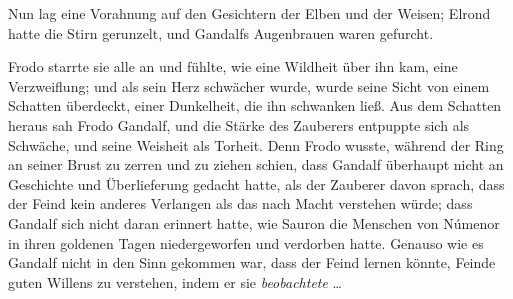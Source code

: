 Nun lag eine Vorahnung auf den Gesichtern der Elben und der Weisen; Elrond hatte die Stirn gerunzelt, und Gandalfs Augenbrauen waren gefurcht.

Frodo starrte sie alle an und fühlte, wie eine Wildheit über ihn kam, eine Verzweiflung; und als sein Herz schwächer wurde, wurde seine Sicht von einem Schatten überdeckt, einer Dunkelheit, die ihn schwanken ließ. Aus dem Schatten heraus sah Frodo Gandalf, und die Stärke des Zauberers entpuppte sich als Schwäche, und seine Weisheit als Torheit. Denn Frodo wusste, während der Ring an seiner Brust zu zerren und zu ziehen schien, dass Gandalf überhaupt nicht an Geschichte und Überlieferung gedacht hatte, als der Zauberer davon sprach, dass der Feind kein anderes Verlangen als das nach Macht verstehen würde; dass Gandalf sich nicht daran erinnert hatte, wie Sauron die Menschen von Númenor in ihren goldenen Tagen niedergeworfen und verdorben hatte. Genauso wie es Gandalf nicht in den Sinn gekommen war, dass der Feind lernen könnte, Feinde guten Willens zu verstehen, indem er sie \emph{beobachtete} …

